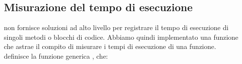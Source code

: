 

\subsection{Misurazione del tempo di esecuzione}
\label{sub:stopwatch}

\noindent {} non fornisce soluzioni ad alto livello per registrare il tempo di esecuzione di singoli metodi o blocchi di codice. Abbiamo quindi implementato una funzione  che astrae il compito di misurare i tempi di esecuzione di una funzione. \\

\noindent {} definisce la
funzione generica , che:

